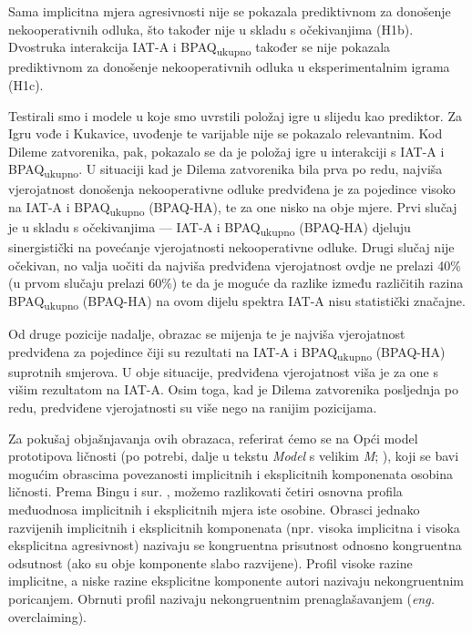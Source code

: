 \documentclass[a4paper, 12pt]{report}
\begin{document}
Sama implicitna mjera agresivnosti nije se pokazala prediktivnom za donošenje
nekooperativnih odluka, što također nije u skladu s očekivanjima (H1b).
Dvostruka interakcija IAT-A i BPAQ\textsubscript{ukupno} također se
nije pokazala prediktivnom za donošenje nekooperativnih odluka u
eksperimentalnim igrama (H1c).

Testirali smo i modele u koje smo uvrstili položaj igre u slijedu kao prediktor.
Za Igru vođe i Kukavice, uvođenje te varijable nije se pokazalo relevantnim. 
Kod Dileme zatvorenika, pak, pokazalo se da je položaj igre u
interakciji s IAT-A i BPAQ\textsubscript{ukupno}. U situaciji kad je
Dilema zatvorenika bila prva po redu, najviša vjerojatnost donošenja
nekooperativne odluke predviđena je za pojedince visoko na IAT-A i
BPAQ\textsubscript{ukupno} (BPAQ-HA), te za one nisko na obje mjere. Prvi slučaj
je u skladu s očekivanjima --- IAT-A i BPAQ\textsubscript{ukupno} (BPAQ-HA)
djeluju sinergistički na povećanje vjerojatnosti nekooperativne odluke. Drugi
slučaj nije očekivan, no valja uočiti da najviša predviđena vjerojatnost ovdje ne
prelazi 40\% (u prvom slučaju prelazi 60\%) te da je moguće da razlike između
različitih razina BPAQ\textsubscript{ukupno} (BPAQ-HA) na ovom dijelu spektra
IAT-A nisu statistički značajne.

Od druge pozicije nadalje, obrazac se  mijenja te je najviša vjerojatnost
predviđena za pojedince čiji su rezultati na IAT-A i BPAQ\textsubscript{ukupno}
(BPAQ-HA) suprotnih smjerova. U obje situacije, predviđena vjerojatnost viša je
za one s višim rezultatom na IAT-A. Osim toga, kad je Dilema zatvorenika
posljednja po redu, predviđene vjerojatnosti su više nego na ranijim pozicijama.

Za pokušaj objašnjavanja ovih obrazaca, referirat ćemo se na 
Opći model prototipova ličnosti (po potrebi, dalje u tekstu \emph{Model} s
velikim \emph{M}; \citealp{bing2007integrating}), koji se bavi 
mogućim obrascima povezanosti implicitnih i eksplicitnih komponenata osobina
ličnosti.
Prema Bingu i sur. \citeyearpar{bing2007integrating}, možemo razlikovati četiri osnovna profila
međuodnosa implicitnih i eksplicitnih mjera iste osobine. Obrasci jednako
razvijenih
implicitnih i eksplicitnih komponenata (npr. visoka implicitna i
visoka eksplicitna agresivnost) nazivaju se kongruentna prisutnost odnosno
kongruentna odsutnost (ako su obje komponente slabo razvijene). 
Profil visoke razine implicitne, a niske
razine eksplicitne komponente autori nazivaju nekongruentnim poricanjem. Obrnuti profil
nazivaju nekongruentnim prenaglašavanjem (\emph{eng.} overclaiming). 
\end{document}
